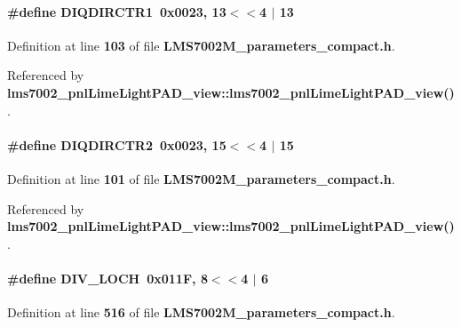 \paragraph[{D\+I\+Q\+D\+I\+R\+C\+T\+R1}]{\setlength{\rightskip}{0pt plus 5cm}\#define D\+I\+Q\+D\+I\+R\+C\+T\+R1~0x0023, 13$<$$<$4 $\vert$  13}\label{LMS7002M__parameters__compact_8h_aac4f88390227903f7e4fade8cbd595ca}


Definition at line {\bf 103} of file {\bf L\+M\+S7002\+M\+\_\+parameters\+\_\+compact.\+h}.



Referenced by {\bf lms7002\+\_\+pnl\+Lime\+Light\+P\+A\+D\+\_\+view\+::lms7002\+\_\+pnl\+Lime\+Light\+P\+A\+D\+\_\+view()}.

\paragraph[{D\+I\+Q\+D\+I\+R\+C\+T\+R2}]{\setlength{\rightskip}{0pt plus 5cm}\#define D\+I\+Q\+D\+I\+R\+C\+T\+R2~0x0023, 15$<$$<$4 $\vert$  15}\label{LMS7002M__parameters__compact_8h_ad3955d99cca97f463442169a8e62d2e5}


Definition at line {\bf 101} of file {\bf L\+M\+S7002\+M\+\_\+parameters\+\_\+compact.\+h}.



Referenced by {\bf lms7002\+\_\+pnl\+Lime\+Light\+P\+A\+D\+\_\+view\+::lms7002\+\_\+pnl\+Lime\+Light\+P\+A\+D\+\_\+view()}.

\paragraph[{D\+I\+V\+\_\+\+L\+O\+CH}]{\setlength{\rightskip}{0pt plus 5cm}\#define D\+I\+V\+\_\+\+L\+O\+CH~0x011\+F, 8$<$$<$4 $\vert$  6}\label{LMS7002M__parameters__compact_8h_aaef4afb1e9f0d59af5c58b43093dd129}


Definition at line {\bf 516} of file {\bf L\+M\+S7002\+M\+\_\+parameters\+\_\+compact.\+h}.



